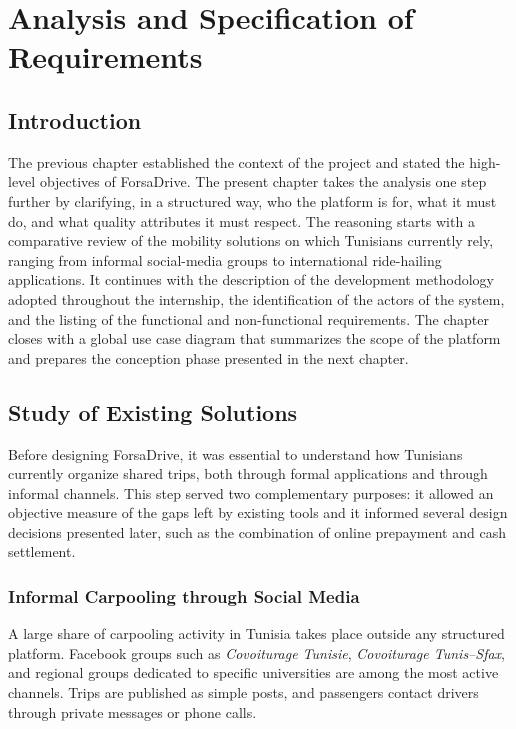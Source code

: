 \chapter{Analysis and Specification of Requirements}

\clearpage
\section*{Introduction}

The previous chapter established the context of the project and stated the high-level objectives of ForsaDrive. The present chapter takes the analysis one step further by clarifying, in a structured way, who the platform is for, what it must do, and what quality attributes it must respect. The reasoning starts with a comparative review of the mobility solutions on which Tunisians currently rely, ranging from informal social-media groups to international ride-hailing applications. It continues with the description of the development methodology adopted throughout the internship, the identification of the actors of the system, and the listing of the functional and non-functional requirements. The chapter closes with a global use case diagram that summarizes the scope of the platform and prepares the conception phase presented in the next chapter.


\section{Study of Existing Solutions}

Before designing ForsaDrive, it was essential to understand how Tunisians currently organize shared trips, both through formal applications and through informal channels. This step served two complementary purposes: it allowed an objective measure of the gaps left by existing tools and it informed several design decisions presented later, such as the combination of online prepayment and cash settlement.

\subsection{Informal Carpooling through Social Media}

A large share of carpooling activity in Tunisia takes place outside any structured platform. Facebook groups such as \textit{Covoiturage Tunisie}, \textit{Covoiturage Tunis--Sfax}, and regional groups dedicated to specific universities are among the most active channels. Trips are published as simple posts, and passengers contact drivers through private messages or phone calls.

